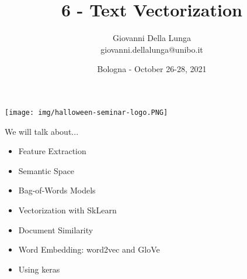 \documentclass[11pt]{beamer}
\author{Giovanni Della Lunga\\{\footnotesize giovanni.dellalunga@unibo.it}}
\title{6 - Text Vectorization}
\subtitle{} %
\institute{Halloween Conference in Quantitative Finance}
\date{Bologna - October 26-28, 2021}
\begin{document}
\begin{frame}
\texttt{[image: img/halloween-seminar-logo.PNG]}
\end{frame}

\begin{frame}
\titlepage
\end{frame}

\AtBeginSubsection{\frame{\subsectionpage}}


\begin{frame}{We will talk about...}
\begin{itemize}
\item Feature Extraction
\item Semantic Space
\item Bag-of-Words Models
\item Vectorization with SkLearn
\item Document Similarity
\item Word Embedding: word2vec and GloVe
\item Using keras
\end{itemize}
\end{frame}
\end{document}

